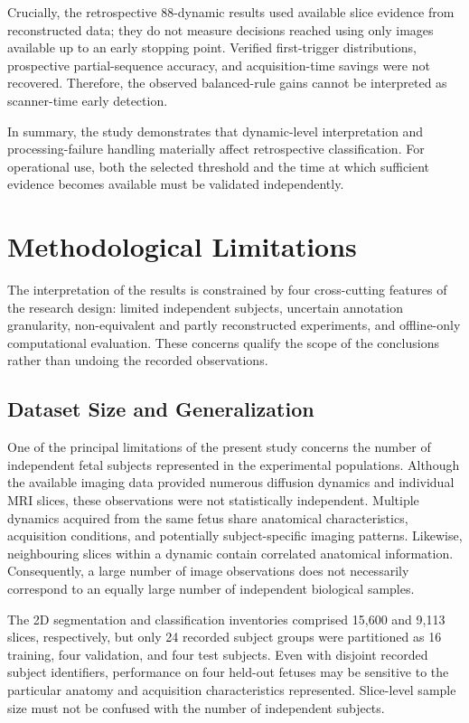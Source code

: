 Crucially, the retrospective 88-dynamic results used available slice evidence from reconstructed data; they do not measure decisions reached using only images available up to an early stopping point. Verified first-trigger distributions, prospective partial-sequence accuracy, and acquisition-time savings were not recovered. Therefore, the observed balanced-rule gains cannot be interpreted as scanner-time early detection.

In summary, the study demonstrates that dynamic-level interpretation and processing-failure handling materially affect retrospective classification. For operational use, both the selected threshold and the time at which sufficient evidence becomes available must be validated independently.

\section{Methodological Limitations}
\label{sec:discussion_limitations}

The interpretation of the results is constrained by four cross-cutting features of the research design: limited independent subjects, uncertain annotation granularity, non-equivalent and partly reconstructed experiments, and offline-only computational evaluation. These concerns qualify the scope of the conclusions rather than undoing the recorded observations.

\subsection{Dataset Size and Generalization}

One of the principal limitations of the present study concerns the number of independent fetal subjects represented in the experimental populations. Although the available imaging data provided numerous diffusion dynamics and individual MRI slices, these observations were not statistically independent. Multiple dynamics acquired from the same fetus share anatomical characteristics, acquisition conditions, and potentially subject-specific imaging patterns. Likewise, neighbouring slices within a dynamic contain correlated anatomical information. Consequently, a large number of image observations does not necessarily correspond to an equally large number of independent biological samples.

The 2D segmentation and classification inventories comprised 15,600 and 9,113 slices, respectively, but only 24 recorded subject groups were partitioned as 16 training, four validation, and four test subjects. Even with disjoint recorded subject identifiers, performance on four held-out fetuses may be sensitive to the particular anatomy and acquisition characteristics represented. Slice-level sample size must not be confused with the number of independent subjects.

